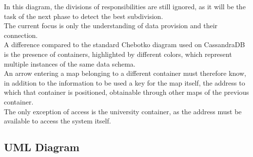 \documentclass[ManualeSviluppatore.tex]{subfiles}
\begin{document}
In this diagram, the divisions of responsibilities are still ignored, as it will be the task of the next phase to detect the best subdivision.\\
The current focus is only the understanding of data provision and their connection.\\

A difference compared to the standard Chebotko diagram used on CassandraDB is the presence of containers, highlighted by different colors, which represent multiple instances of the same data schema.\\
An arrow entering a map belonging to a different container must therefore know, in addition to the information to be used a key for the map itself, the address to which that container is positioned, obtainable through other maps of the previous container.\\
The only exception of access is the university container, as the address must be available to access the system itself.\\

\subsection{UML Diagram}
\end{document}
